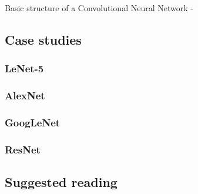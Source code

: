 \begin{frame}[t,allowframebreaks]{Basic structure of a Convolutional Neural Network -}
\end{frame}


\subsection{Case studies}


\subsubsection{LeNet-5}

\subsubsection{AlexNet}

\subsubsection{GoogLeNet}

\subsubsection{ResNet}

%

%

\subsection{Suggested reading}

